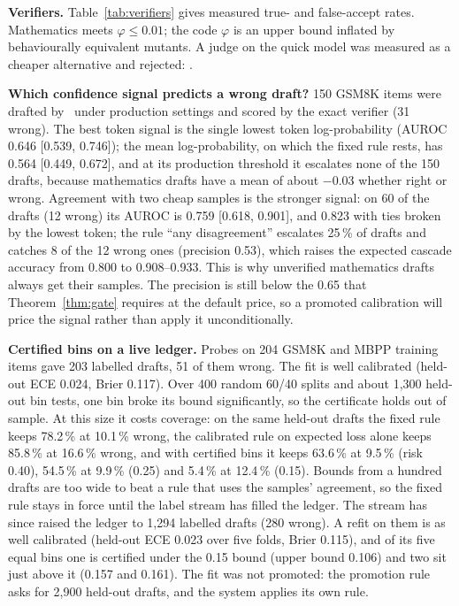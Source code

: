 \textbf{Verifiers.} Table~\ref{tab:verifiers} gives measured true- and
false-accept rates. Mathematics meets $\varphi\le0.01$; the code $\varphi$ is
an upper bound inflated by behaviourally equivalent mutants. A judge on the
quick model was measured as a cheaper alternative and rejected: \JudgeCompare.

\begin{table}[t]
\centering\caption{Verifier quality: $r$ from correct answers, $\varphi$ from seeded mutants}\label{tab:verifiers}
\resizebox{\columnwidth}{!}{\VerifierTable}
\end{table}

\textbf{Which confidence signal predicts a wrong draft?} 150 GSM8K items were
drafted by \Sone\ under production settings and scored by the exact verifier
(31 wrong). The best token signal is the single lowest token log-probability
(AUROC 0.646 [0.539, 0.746]); the mean log-probability, on which the fixed
rule rests, has 0.564 [0.449, 0.672], and at its production threshold it
escalates none of the 150 drafts, because mathematics drafts have a mean of
about $-0.03$ whether right or wrong. Agreement with two cheap samples is the
stronger signal: on 60 of the drafts (12 wrong) its AUROC is 0.759 [0.618,
0.901], and 0.823 with ties broken by the lowest token; the rule ``any
disagreement'' escalates 25\,\% of drafts and catches 8 of the 12 wrong ones
(precision 0.53), which raises the expected cascade accuracy from 0.800 to
0.908--0.933. This is why unverified mathematics drafts always get their
samples. The precision is still below the 0.65 that
Theorem~\ref{thm:gate} requires at the default price, so a promoted
calibration will price the signal rather than apply it unconditionally.

\textbf{Certified bins on a live ledger.} Probes on 204 GSM8K and MBPP
training items gave 203 labelled drafts, 51 of them wrong. The fit is well
calibrated (held-out ECE 0.024, Brier 0.117). Over 400 random 60/40 splits
and about 1{,}300 held-out bin tests, one bin broke its bound significantly,
so the certificate holds out of sample. At this size it costs coverage: on the
same held-out drafts the fixed rule keeps 78.2\,\% at 10.1\,\% wrong, the
calibrated rule on expected loss alone keeps 85.8\,\% at 16.6\,\% wrong, and
with certified bins it keeps 63.6\,\% at 9.5\,\% (risk 0.40), 54.5\,\% at
9.9\,\% (0.25) and 5.4\,\% at 12.4\,\% (0.15). Bounds from a hundred drafts
are too wide to beat a rule that uses the samples' agreement, so the fixed
rule stays in force until the label stream has filled the ledger. The stream
has since raised the ledger to 1{,}294 labelled drafts (280 wrong). A refit
on them is as well calibrated (held-out ECE 0.023 over five folds, Brier
0.115), and of its five equal bins one is certified under the 0.15 bound
(upper bound 0.106) and two sit just above it (0.157 and 0.161). The fit was
not promoted: the promotion rule asks for 2{,}900 held-out drafts, and the
system applies its own rule.

